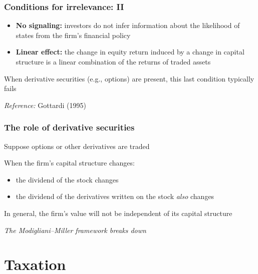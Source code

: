 \documentclass[blue]{beamer}
\theoremstyle{definition}
\theoremstyle{example}
\begin{document}
\begin{frame}\frametitle{Conditions for irrelevance: II}
\begin{itemize}
\item \textbf{No signaling:} investors do not infer information about the likelihood of states from the firm's financial policy
\bigskip
\item \textbf{Linear effect:} the change in equity return induced by a change in capital structure is a linear combination of the returns of traded assets
\end{itemize}
\bigskip

When derivative securities (e.g., options) are present, this last condition typically fails
\bigskip

\emph{Reference:} Gottardi (1995)
\end{frame}

\begin{frame}\frametitle{The role of derivative securities}
Suppose options or other derivatives are traded
\bigskip

When the firm's capital structure changes:
\begin{itemize}
\item the dividend of the stock changes
\item the dividend of the derivatives written on the stock \emph{also} changes
\end{itemize}
\bigskip

In general, the firm's value will not be independent of its capital structure
\bigskip

\emph{The Modigliani--Miller framework breaks down}
\end{frame}

\section{Taxation}
\end{document}
